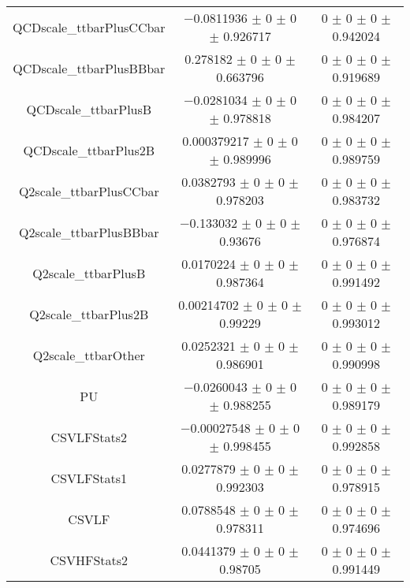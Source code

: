 \begin{table}
\begin{tabular}{ccc}
QCDscale\_ttbarPlusCCbar 	& \num{-0.0811936} $\pm$ \num{0} $\pm$ \num{0} $\pm$ \num{0.926717} 	& \num{0} $\pm$ \num{0} $\pm$ \num{0} $\pm$ \num{0.942024}\\
QCDscale\_ttbarPlusBBbar 	& \num{0.278182} $\pm$ \num{0} $\pm$ \num{0} $\pm$ \num{0.663796} 	& \num{0} $\pm$ \num{0} $\pm$ \num{0} $\pm$ \num{0.919689}\\
QCDscale\_ttbarPlusB 	& \num{-0.0281034} $\pm$ \num{0} $\pm$ \num{0} $\pm$ \num{0.978818} 	& \num{0} $\pm$ \num{0} $\pm$ \num{0} $\pm$ \num{0.984207}\\
QCDscale\_ttbarPlus2B 	& \num{0.000379217} $\pm$ \num{0} $\pm$ \num{0} $\pm$ \num{0.989996} 	& \num{0} $\pm$ \num{0} $\pm$ \num{0} $\pm$ \num{0.989759}\\
Q2scale\_ttbarPlusCCbar 	& \num{0.0382793} $\pm$ \num{0} $\pm$ \num{0} $\pm$ \num{0.978203} 	& \num{0} $\pm$ \num{0} $\pm$ \num{0} $\pm$ \num{0.983732}\\
Q2scale\_ttbarPlusBBbar 	& \num{-0.133032} $\pm$ \num{0} $\pm$ \num{0} $\pm$ \num{0.93676} 	& \num{0} $\pm$ \num{0} $\pm$ \num{0} $\pm$ \num{0.976874}\\
Q2scale\_ttbarPlusB 	& \num{0.0170224} $\pm$ \num{0} $\pm$ \num{0} $\pm$ \num{0.987364} 	& \num{0} $\pm$ \num{0} $\pm$ \num{0} $\pm$ \num{0.991492}\\
Q2scale\_ttbarPlus2B 	& \num{0.00214702} $\pm$ \num{0} $\pm$ \num{0} $\pm$ \num{0.99229} 	& \num{0} $\pm$ \num{0} $\pm$ \num{0} $\pm$ \num{0.993012}\\
Q2scale\_ttbarOther 	& \num{0.0252321} $\pm$ \num{0} $\pm$ \num{0} $\pm$ \num{0.986901} 	& \num{0} $\pm$ \num{0} $\pm$ \num{0} $\pm$ \num{0.990998}\\
PU 	& \num{-0.0260043} $\pm$ \num{0} $\pm$ \num{0} $\pm$ \num{0.988255} 	& \num{0} $\pm$ \num{0} $\pm$ \num{0} $\pm$ \num{0.989179}\\
CSVLFStats2 	& \num{-0.00027548} $\pm$ \num{0} $\pm$ \num{0} $\pm$ \num{0.998455} 	& \num{0} $\pm$ \num{0} $\pm$ \num{0} $\pm$ \num{0.992858}\\
CSVLFStats1 	& \num{0.0277879} $\pm$ \num{0} $\pm$ \num{0} $\pm$ \num{0.992303} 	& \num{0} $\pm$ \num{0} $\pm$ \num{0} $\pm$ \num{0.978915}\\
CSVLF 	& \num{0.0788548} $\pm$ \num{0} $\pm$ \num{0} $\pm$ \num{0.978311} 	& \num{0} $\pm$ \num{0} $\pm$ \num{0} $\pm$ \num{0.974696}\\
CSVHFStats2 	& \num{0.0441379} $\pm$ \num{0} $\pm$ \num{0} $\pm$ \num{0.98705} 	& \num{0} $\pm$ \num{0} $\pm$ \num{0} $\pm$ \num{0.991449}\\

\end{tabular}
\end{table}
